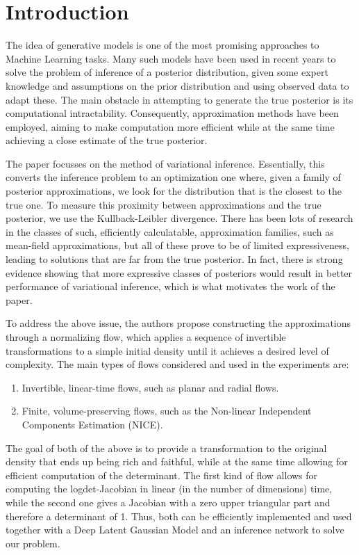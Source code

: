 
\chapter{Introduction}
The idea of generative models is one of the most promising approaches to Machine Learning tasks. Many such models have been used in recent years to solve the problem of inference of a posterior distribution, given some expert knowledge and assumptions on the prior distribution and using observed data to adapt these. The main obstacle in attempting to generate the true posterior is its computational intractability. Consequently, approximation methods have been employed, aiming to make computation more efficient while at the same time achieving a close estimate of the true posterior.

The paper focusses on the method of variational inference. Essentially, this converts the inference problem to an optimization one where, given a family of posterior approximations, we look for the distribution that is the closest to the true one. To measure this proximity between approximations and the true posterior, we use the Kullback-Leibler divergence. There has been lots of research in the classes of such, efficiently calculatable, approximation families, such as mean-field approximations, but all of these prove to be of limited expressiveness, leading to solutions that are far from the true posterior. In fact, there is strong evidence showing that more expressive classes of posteriors would result in better performance of variational inference, which is what motivates the work of the paper.

To address the above issue, the authors propose constructing the approximations through a normalizing flow, which applies a sequence of invertible transformations to a simple initial density until it achieves a desired level of complexity. The main types of flows considered and used in the experiments are:

\begin{enumerate}
	\item Invertible, linear-time flows, such as planar and radial flows.
	\item Finite, volume-preserving flows, such as the Non-linear Independent Components Estimation (NICE).
\end{enumerate}

The goal of both of the above is to provide a transformation to the original density that ends up being rich and faithful, while at the same time allowing for efficient computation of the determinant. The first kind of flow allows for computing the logdet-Jacobian in linear (in the number of dimensions) time, while the second one gives a Jacobian with a zero upper triangular part and therefore a determinant of 1. Thus, both can be efficiently implemented and used together with a Deep Latent Gaussian Model and an inference network to solve our problem.

